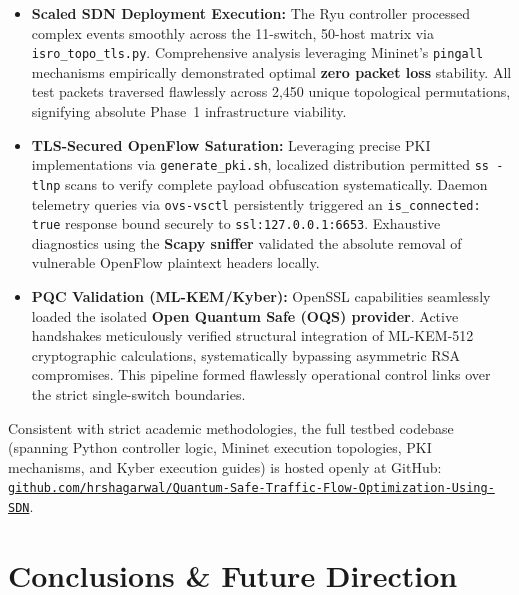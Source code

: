 \documentclass[12pt]{article}
\begin{document}
\begin{itemize}
    \item \textbf{Scaled SDN Deployment Execution:} The Ryu controller processed complex events smoothly across the 11-switch, 50-host matrix via \texttt{isro\_topo\_tls.py}. Comprehensive analysis leveraging Mininet's \texttt{pingall} mechanisms empirically demonstrated optimal \textbf{zero packet loss} stability. All test packets traversed flawlessly across 2,450 unique topological permutations, signifying absolute Phase~1 infrastructure viability.

    \item \textbf{TLS-Secured OpenFlow Saturation:} Leveraging precise PKI implementations via \texttt{generate\_pki.sh}, localized distribution permitted \texttt{ss -tlnp} scans to verify complete payload obfuscation systematically. Daemon telemetry queries via \texttt{ovs-vsctl} persistently triggered an \texttt{is\_connected: true} response bound securely to \texttt{ssl:127.0.0.1:6653}. Exhaustive diagnostics using the \textbf{Scapy sniffer} validated the absolute removal of vulnerable OpenFlow plaintext headers locally.

    \item \textbf{PQC Validation (ML-KEM/Kyber):} OpenSSL capabilities seamlessly loaded the isolated \textbf{Open Quantum Safe (OQS) provider}. Active handshakes meticulously verified structural integration of ML-KEM-512 cryptographic calculations, systematically bypassing asymmetric RSA compromises. This pipeline formed flawlessly operational control links over the strict single-switch boundaries.
\end{itemize}

Consistent with strict academic methodologies, the full testbed codebase (spanning Python controller logic, Mininet execution topologies, PKI mechanisms, and Kyber execution guides) is hosted openly at GitHub: \href{https://github.com/hrshagarwal/Quantum-Safe-Traffic-Flow-Optimization-Using-SDN}{\texttt{github.com/hrshagarwal/Quantum-Safe-Traffic-Flow-Optimization-Using-SDN}}.

\section{Conclusions \& Future Direction}
\end{document}
